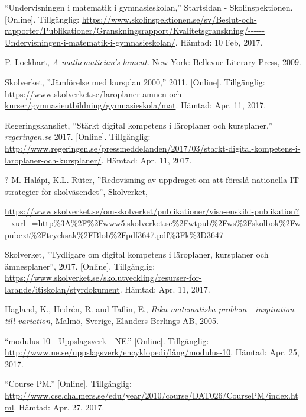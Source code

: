     “Undervisningen i matematik i gymnasieskolan,” Startsidan - Skolinspektionen. [Online]. Tillgänglig: \url{https://www.skolinspektionen.se/sv/Beslut-och-rapporter/Publikationer/Granskningsrapport/Kvalitetsgranskning/------Undervisningen-i-matematik-i-gymnasieskolan/}. Hämtad: 10 Feb, 2017.
    
    P. Lockhart, \textsl{A mathematician's lament}. New York: Bellevue Literary Press, 2009.
    
    Skolverket, ''Jämförelse med kursplan 2000,'' 2011. [Online]. Tillgänglig: \url{https://www.skolverket.se/laroplaner-amnen-och-kurser/gymnasieutbildning/gymnasieskola/mat}. Hämtad: Apr. 11, 2017.
    
    Regeringskansliet, ''Stärkt digital kompetens i läroplaner och kursplaner,'' \textsl{regeringen.se} 2017. [Online]. Tillgänglig: \url{http://www.regeringen.se/pressmeddelanden/2017/03/starkt-digital-kompetens-i-laroplaner-och-kursplaner/}. Hämtad: Apr. 11, 2017.
    
    ?
    M. Halápi, K.L. Rüter, ''Redovisning av uppdraget om att föreslå nationella IT-strategier för skolväsendet'', Skolverket,
    
    \url{https://www.skolverket.se/om-skolverket/publikationer/visa-enskild-publikation?_xurl_=http\%3A\%2F\%2Fwww5.skolverket.se\%2Fwtpub\%2Fws\%2Fskolbok\%2Fwpubext\%2Ftrycksak\%2FBlob\%2Fpdf3647.pdf\%3Fk\%3D3647}
    
   Skolverket, ''Tydligare om digital kompetens i läroplaner, kursplaner och ämnesplaner'', 2017. [Online]. Tillgänglig: \url{https://www.skolverket.se/skolutveckling/resurser-for-larande/itiskolan/styrdokument}. Hämtad: Apr. 11, 2017.
   
    Hagland, K., Hedrén, R. and Taflin, E., \textit{Rika matematiska problem - inspiration till variation}, Malmö, Sverige, Elanders Berlings AB, 2005.
    
    “modulus 10 - Uppslagsverk - NE.” [Online]. Tillgänglig: \url{http://www.ne.se/uppslagsverk/encyklopedi/lång/modulus-10}. 
    Hämtad: Apr. 25, 2017.
    
    “Course PM.” [Online]. Tillgänglig: \url{http://www.cse.chalmers.se/edu/year/2010/course/DAT026/CoursePM/index.html}. 
    Hämtad: Apr. 27, 2017.
    
